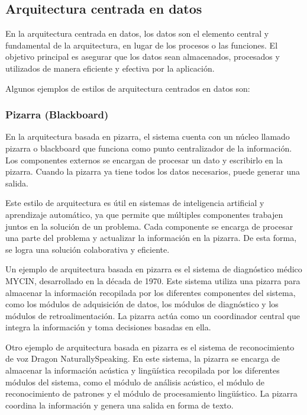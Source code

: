 \documentclass[executivepaper]{article}
\begin{document}
\newpage
\subsection{Arquitectura centrada en datos}

En la arquitectura centrada en datos, los datos son el elemento central y fundamental de la arquitectura, en lugar de los procesos o las funciones. El objetivo principal es asegurar que los datos sean almacenados, procesados y utilizados de manera eficiente y efectiva por la aplicación.

Algunos ejemplos de estilos de arquitectura centrados en datos son:

\subsubsection*{Pizarra (Blackboard)}

En la arquitectura basada en pizarra, el sistema cuenta con un núcleo llamado pizarra o blackboard que funciona como punto centralizador de la información. Los componentes externos se encargan de procesar un dato y escribirlo en la pizarra. Cuando la pizarra ya tiene todos los datos necesarios, puede generar una salida.

Este estilo de arquitectura es útil en sistemas de inteligencia artificial y aprendizaje automático, ya que permite que múltiples componentes trabajen juntos en la solución de un problema. Cada componente se encarga de procesar una parte del problema y actualizar la información en la pizarra. De esta forma, se logra una solución colaborativa y eficiente.

Un ejemplo de arquitectura basada en pizarra es el sistema de diagnóstico médico MYCIN, desarrollado en la década de 1970. Este sistema utiliza una pizarra para almacenar la información recopilada por los diferentes componentes del sistema, como los módulos de adquisición de datos, los módulos de diagnóstico y los módulos de retroalimentación. La pizarra actúa como un coordinador central que integra la información y toma decisiones basadas en ella.

Otro ejemplo de arquitectura basada en pizarra es el sistema de reconocimiento de voz Dragon NaturallySpeaking. En este sistema, la pizarra se encarga de almacenar la información acústica y lingüística recopilada por los diferentes módulos del sistema, como el módulo de análisis acústico, el módulo de reconocimiento de patrones y el módulo de procesamiento lingüístico. La pizarra coordina la información y genera una salida en forma de texto.
\end{document}
